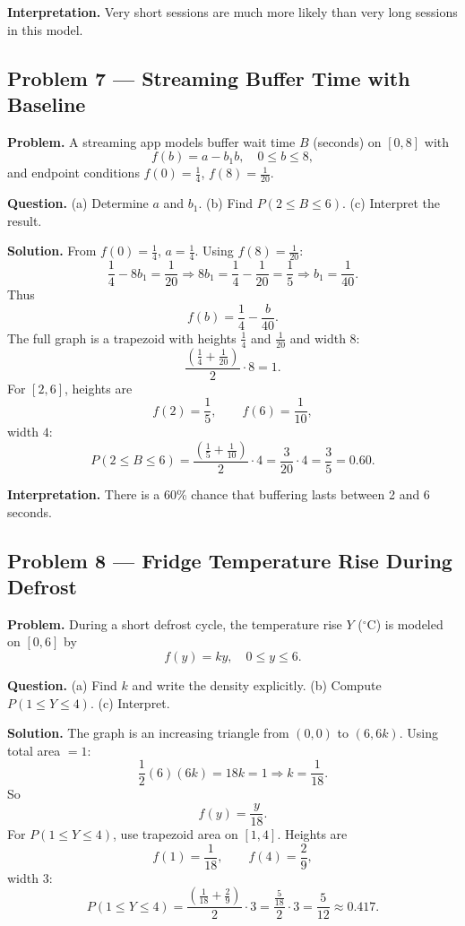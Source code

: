 \begin{ExamProblems}
\textbf{Interpretation.}
Very short sessions are much more likely than very long sessions in this model.


\item
\subsection*{Problem 7 — Streaming Buffer Time with Baseline}

\textbf{Problem.}
A streaming app models buffer wait time $B$ (seconds) on $[0,8]$ with
\[
f(b)=a-b_1 b,\quad 0\le b\le 8,
\]
and endpoint conditions $f(0)=\frac14$, $f(8)=\frac{1}{20}$.

\textbf{Question.}
(a) Determine $a$ and $b_1$. (b) Find $P(2\le B\le 6)$. (c) Interpret the result.

\textbf{Solution.}
From $f(0)=\frac14$, $a=\frac14$.
Using $f(8)=\frac{1}{20}$:
\[
\frac14-8b_1=\frac{1}{20}\Rightarrow 8b_1=\frac14-\frac{1}{20}=\frac15
\Rightarrow b_1=\frac{1}{40}.
\]
Thus
\[
f(b)=\frac14-\frac{b}{40}.
\]
The full graph is a trapezoid with heights $\frac14$ and $\frac{1}{20}$ and width $8$:
\[
\frac{\left(\frac14+\frac{1}{20}\right)}{2}\cdot 8=1.
\]
For $[2,6]$, heights are
\[
f(2)=\frac15,\qquad f(6)=\frac{1}{10},
\]
width $4$:
\[
P(2\le B\le 6)=\frac{\left(\frac15+\frac{1}{10}\right)}{2}\cdot 4
=\frac{3}{20}\cdot 4=\frac{3}{5}=0.60.
\]

\textbf{Interpretation.}
There is a 60\% chance that buffering lasts between 2 and 6 seconds.


\item
\subsection*{Problem 8 — Fridge Temperature Rise During Defrost}

\textbf{Problem.}
During a short defrost cycle, the temperature rise $Y$ ($^\circ$C) is modeled on $[0,6]$ by
\[
f(y)=ky,\quad 0\le y\le 6.
\]

\textbf{Question.}
(a) Find $k$ and write the density explicitly. (b) Compute $P(1\le Y\le 4)$. (c) Interpret.

\textbf{Solution.}
The graph is an increasing triangle from $(0,0)$ to $(6,6k)$.
Using total area $=1$:
\[
\frac12(6)(6k)=18k=1\Rightarrow k=\frac{1}{18}.
\]
So
\[
f(y)=\frac{y}{18}.
\]
For $P(1\le Y\le 4)$, use trapezoid area on $[1,4]$.
Heights are
\[
f(1)=\frac{1}{18},\qquad f(4)=\frac{2}{9},
\]
width $3$:
\[
P(1\le Y\le 4)=\frac{\left(\frac{1}{18}+\frac{2}{9}\right)}{2}\cdot 3
=\frac{\frac{5}{18}}{2}\cdot 3=\frac{5}{12}\approx 0.417.
\]


\end{ExamProblems}
